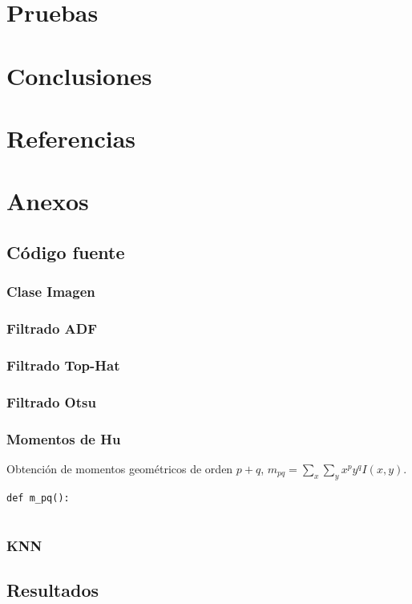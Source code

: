 \documentclass[letter]{article}
\begin{document}
\section{Pruebas}
\label{sec:org6a8b081}

\section{Conclusiones}
\label{sec:org770b5e5}

\section{Referencias}
\label{sec:org01f08c3}

\section{Anexos}
\label{sec:org1f5f1c1}
\subsection{Código fuente}
\label{sec:orgd410e19}
\subsubsection{Clase Imagen}
\label{sec:orgf92bca0}
\subsubsection{Filtrado ADF}
\label{sec:org82aa120}
\subsubsection{Filtrado Top-Hat}
\label{sec:org9b8c6f8}
\subsubsection{Filtrado Otsu}
\label{sec:org8c0ec14}
\subsubsection{Momentos de Hu}
\label{sec:org2809b90}
Obtención de momentos geométricos de orden \(p+q\), \(m_{pq} = \sum_x \sum_y x^p y^q I(x, y)\).

\begin{verbatim}
def m_pq():
   
\end{verbatim}

\subsubsection{KNN}
\label{sec:org93ecd5c}

\subsection{Resultados}
\label{sec:org5a3f67e}
\end{document}

